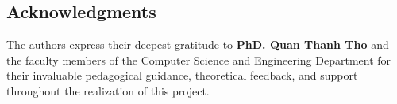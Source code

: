 \subsection*{Acknowledgments}
The authors express their deepest gratitude to \textbf{PhD. Quan Thanh Tho} and the faculty members of the Computer Science and Engineering Department for their invaluable pedagogical guidance, theoretical feedback, and support throughout the realization of this project.
